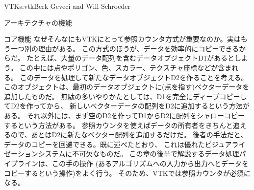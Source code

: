 \begin{aosachapter}{VTK}{s:vtk}{Berk Geveci and Will Schroeder}
\begin{aosasect1}{アーキテクチャの機能}
\begin{aosasect2}{コア機能}
なぜそんなにもVTKにとって参照カウンタ方式が重要なのか。実はもう一つ別の理由がある。
この方式のほうが、データを効率的にコピーできるからだ。
たとえば、大量のデータ配列を含むデータオブジェクトD1があるとしよう。
この中には点やポリゴン、色、スカラー、テクスチャ座標などが含まれる。
このデータを処理して新たなデータオブジェクトD2を作ることを考える。
このオブジェクトは、最初のデータオブジェクトに(点を指す)ベクターデータを追加したものだ。
無駄の多いやりかたとしては、D1を完全にディープコピーしてD2を作ってから、
新しいベクターデータの配列をD2に追加するという方法がある。
それ以外には、まず空のD2を作ってD1からD2に配列をシャローコピーするという方法がある。
参照カウンタを使えばデータの所有者をきちんと追えるので、あとはD2に新たなベクター配列を追加するだけだ。
後者の手法だと、データのコピーを回避できる。既に述べたとおり、
これは優れたビジュアライゼーションシステムに不可欠なものだ。
この章の後半で解説するデータ処理パイプラインは、この手の操作
(あるアルゴリズムへの入力から出力へとデータをコピーするという操作)をよく行う。
そのため、VTKでは参照カウンタが必須になる。


\end{aosasect2}
\end{aosasect1}
\end{aosachapter}
